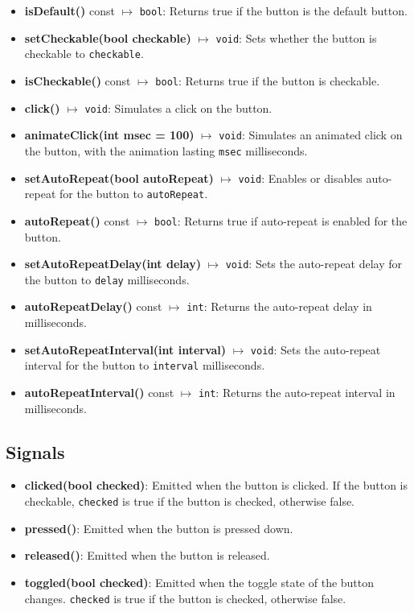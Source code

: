 \documentclass{report}
\begin{document}
\begin{itemize}
        \item \textbf{isDefault()} const $\mapsto$ \texttt{bool}: Returns true if the button is the default button.
        \item \textbf{setCheckable(bool checkable)} $\mapsto$ \texttt{void}: Sets whether the button is checkable to \texttt{checkable}.
        \item \textbf{isCheckable()} const $\mapsto$ \texttt{bool}: Returns true if the button is checkable.
        \item \textbf{click()} $\mapsto$ \texttt{void}: Simulates a click on the button.
        \item \textbf{animateClick(int msec = 100)} $\mapsto$ \texttt{void}: Simulates an animated click on the button, with the animation lasting \texttt{msec} milliseconds.
        \item \textbf{setAutoRepeat(bool autoRepeat)} $\mapsto$ \texttt{void}: Enables or disables auto-repeat for the button to \texttt{autoRepeat}.
        \item \textbf{autoRepeat()} const $\mapsto$ \texttt{bool}: Returns true if auto-repeat is enabled for the button.
        \item \textbf{setAutoRepeatDelay(int delay)} $\mapsto$ \texttt{void}: Sets the auto-repeat delay for the button to \texttt{delay} milliseconds.
        \item \textbf{autoRepeatDelay()} const $\mapsto$ \texttt{int}: Returns the auto-repeat delay in milliseconds.
        \item \textbf{setAutoRepeatInterval(int interval)} $\mapsto$ \texttt{void}: Sets the auto-repeat interval for the button to \texttt{interval} milliseconds.
        \item \textbf{autoRepeatInterval()} const $\mapsto$ \texttt{int}: Returns the auto-repeat interval in milliseconds.
    \end{itemize}
    \bigbreak \noindent 
    \subsection{Signals}
    \begin{itemize}
        \item \textbf{clicked(bool checked)}: Emitted when the button is clicked. If the button is checkable, \texttt{checked} is true if the button is checked, otherwise false.
        \item \textbf{pressed()}: Emitted when the button is pressed down.
        \item \textbf{released()}: Emitted when the button is released.
        \item \textbf{toggled(bool checked)}: Emitted when the toggle state of the button changes. \texttt{checked} is true if the button is checked, otherwise false.
    \end{itemize}
\end{document}
